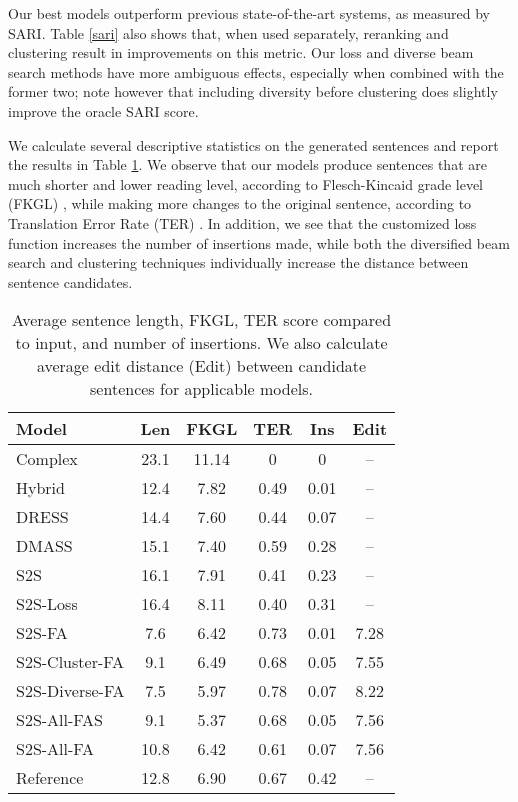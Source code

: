 \documentclass[11pt,a4paper]{article}
\begin{document}
Our best models outperform previous state-of-the-art systems, as measured by SARI. Table \ref{sari} also shows that, when used separately, reranking and clustering result in improvements on this metric. Our loss and diverse beam search methods have more ambiguous effects, especially when combined with the former two; note however that including diversity before clustering does slightly improve the oracle SARI score.

We calculate several descriptive statistics on the generated sentences and report the results in Table \ref{stats}. We observe that our models produce sentences that are much shorter and lower reading level, according to Flesch-Kincaid grade level (FKGL) \cite{kincaid1975derivation}, while making more changes to the original sentence, according to Translation Error Rate (TER) \cite{snover2006study}. In addition, we see that the customized loss function increases the number of insertions made, while both the diversified beam search and clustering techniques individually increase the distance between sentence candidates.

\begin{table}
\begin{center}
\small
\begin{tabular}{|l|ccccc|} \hline
\textbf{Model} & \textbf{Len} & \textbf{FKGL} & \textbf{TER} & \textbf{Ins} & \textbf{Edit}\\ \hline
Complex & 23.1 & 11.14 & 0 & 0 & -- \\ \hline
Hybrid & 12.4 & 7.82 & 0.49 & 0.01 & --\\
DRESS & 14.4 & 7.60 & 0.44 & 0.07 & --\\ 
DMASS & 15.1 & 7.40 & 0.59 & 0.28 & -- \\ \hline
S2S & 16.1 & 7.91 & 0.41 & 0.23 & -- \\
S2S-Loss & 16.4 & 8.11 & 0.40 & 0.31 & --\\
S2S-FA & 7.6 & 6.42 & 0.73 & 0.01 & 7.28 \\
{\scriptsize S2S-Cluster-FA} & 9.1 & 6.49 & 0.68 & 0.05 & 7.55 \\
{\scriptsize S2S-Diverse-FA} & 7.5 & 5.97 & 0.78 & 0.07 & 8.22 \\
S2S-All-FAS & 9.1 & 5.37 & 0.68 & 0.05 & 7.56 \\
S2S-All-FA & 10.8 & 6.42 & 0.61 & 0.07 & 7.56 \\ \hline
Reference & 12.8 & 6.90 & 0.67 & 0.42 & --\\
\hline
\end{tabular}
\end{center}
\caption{\label{stats} Average sentence length, FKGL, TER score compared to input, and number of insertions. We also calculate average edit distance (Edit) between candidate sentences for applicable models.}
\end{table}
\end{document}
